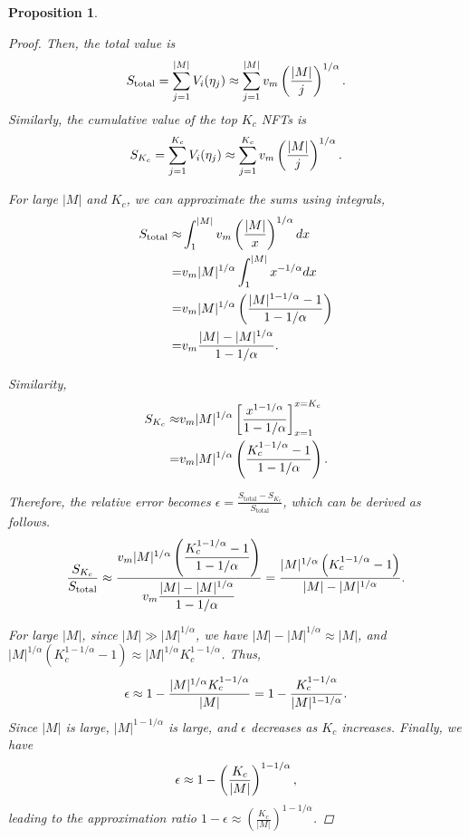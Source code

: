 \documentclass[conference]{IEEEtran}
\newcommand{\1}[1]{\mathds{1}\left[#1\right]}
\theoremstyle{plain}
\newtheorem{proposition}{Proposition}
\begin{document}
\begin{proposition}
{\begin{proof}
Then, the total value is
\begin{equation}\small
    S_{\text{total}} = \sum_{j=1}^{|M|} V_i(\eta_j) \approx \sum_{j=1}^{|M|} v_m \left( \frac{|M|}{j} \right)^{1/\alpha}.
\end{equation}
Similarly, the cumulative value of the top $K_c$ NFTs is 
\begin{equation}\small
    S_{K_c} = \sum_{j=1}^{K_c} V_i(\eta_j) \approx \sum_{j=1}^{K_c} v_m \left( \frac{|M|}{j} \right)^{1/\alpha}.
\end{equation}

For large $|M|$ and $K_c$, we can approximate the sums using integrals,
\begin{align*}\small
    S_{\text{total}} \approx & \int_{1}^{|M|} v_m \left( \frac{|M|}{x} \right)^{1/\alpha} dx  \\ = & v_m |M|^{1/\alpha} \int_{1}^{|M|} x^{-1/\alpha} dx \\ = & v_m |M|^{1/\alpha} \left( \frac{|M|^{1 - 1/\alpha} - 1}{1 - 1/\alpha} \right)
    \\ = & v_m \frac{|M| - |M|^{1/\alpha}}{1 - 1/\alpha}.
\end{align*}

Similarity, 
\begin{align*}\small
    S_{K_c} \approx &  v_m |M|^{1/\alpha} \left[ \frac{x^{1 - 1/\alpha}}{1 - 1/\alpha} \right]_{x=1}^{x=K_c} \\ = &  v_m |M|^{1/\alpha} \left( \frac{K_c^{1 - 1/\alpha} - 1}{1 - 1/\alpha} \right).
\end{align*}

Therefore, the relative error becomes $\epsilon = \frac{S_{\text{total}} - S_{K_c}}{S_{\text{total}}}$, which can be derived as follows.
\begin{equation}\small
    \frac{S_{K_c}}{S_{\text{total}}} \approx \frac{v_m |M|^{1/\alpha} \left( \dfrac{K_c^{1 - 1/\alpha} - 1}{1 - 1/\alpha} \right)}{v_m \dfrac{|M| - |M|^{1/\alpha}}{1 - 1/\alpha}} = \frac{|M|^{1/\alpha} \left( K_c^{1 - 1/\alpha} - 1 \right)}{|M| - |M|^{1/\alpha}}.
\end{equation}

For large $|M|$, since $|M| \gg |M|^{1/\alpha}$, we have $|M| - |M|^{1/\alpha} \approx |M|$, and $ |M|^{1/\alpha} \left( K_c^{1 - 1/\alpha} - 1 \right) \approx |M|^{1/\alpha} K_c^{1 - 1/\alpha}$. Thus,
\begin{equation}\small
    \epsilon \approx 1 - \frac{|M|^{1/\alpha} K_c^{1 - 1/\alpha}}{|M|} = 1 - \frac{K_c^{1 - 1/\alpha}}{|M|^{1 - 1/\alpha}}.
\end{equation}
Since $|M|$ is large, $|M|^{1 - 1/\alpha}$ is large, and $\epsilon$ decreases as $K_c$ increases. 
Finally, we have
\begin{equation}\small
    \epsilon \approx 1 - \left( \frac{K_c}{|M|} \right)^{1 - 1/\alpha},
\end{equation}
leading to the approximation ratio $1 - \epsilon \approx \left( \frac{K_c}{|M|} \right)^{1 - 1/\alpha}$.


\end{proof}}
\end{proposition}
\end{document}
